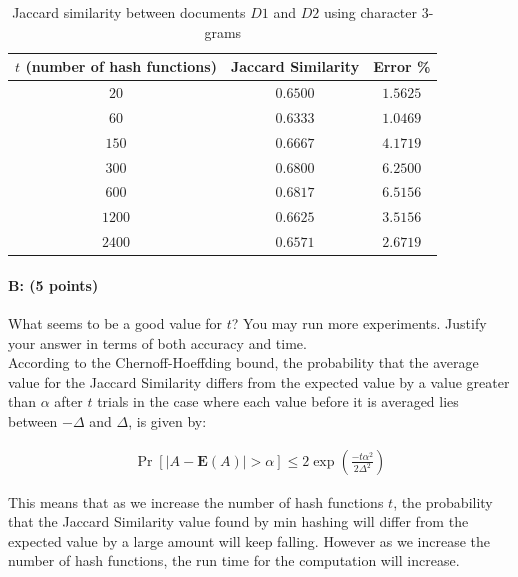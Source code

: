 \documentclass[11pt]{article}
\begin{document}
    \begin{table}[!h] 
    \centering
  \caption{Jaccard similarity between documents $D1$ and $D2$ using character $3$-grams}
    \begin{tabular}{|c|c|c|}
      \hline
   $t$ (number of hash functions)  & Jaccard Similarity  & Error \% \\
      \hline      
      $20$ &   $0.6500$  &   $1.5625$   \\
      \hline      
      $60$ &    $0.6333$  & $1.0469$ \\
      \hline      
      $150$ &    $0.6667$  &  $4.1719$\\
      \hline      
      $300$ &      $0.6800$  &   $6.2500$\\
      \hline
      $600$ &      $0.6817$    & $6.5156$\\
      \hline
      $1200$ &      $0.6625$    & $3.5156$\\
        \hline
      $2400$ &      $0.6571$    & $2.6719$\\
    \hline
    \end{tabular}
    \end{table}
    
\paragraph{B: (5 points)} 
What seems to be a good value for $t$? You may run more experiments. Justify your answer in terms of both accuracy and time.\\

According to the Chernoff-Hoeffding bound, the probability that the average value for the Jaccard Similarity differs from the expected value by a value greater than $\alpha$ after $t$ trials in the case where each value before it is averaged lies between $-\Delta$ and $\Delta$, is given by: 

\begin{equation*}
\begin{aligned}
\Pr \left [ \left |A - \textbf{E} \left (A\right ) \right| > \alpha \right ] \leq 2 \exp \left ( \frac{-t \alpha^2}{2 \Delta^2} \right)
\end{aligned}
\end{equation*}

This means that as we increase the number of hash functions $t$, the probability that the Jaccard Similarity value found by min hashing will differ from the expected value by a large amount will keep falling. However as we increase the number of hash functions, the run time for the computation will increase. \\
\end{document}
